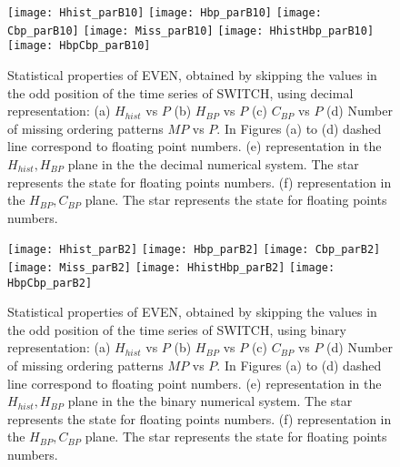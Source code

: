 \begin{figure}
	\texttt{[image: Hhist\_parB10]}
	\texttt{[image: Hbp\_parB10]}
	\texttt{[image: Cbp\_parB10]}
	\texttt{[image: Miss\_parB10]}
	\texttt{[image: HhistHbp\_parB10]}
	\texttt{[image: HbpCbp\_parB10]}
	\caption{Statistical properties of EVEN, obtained by skipping the values in the odd position of the time series of  SWITCH,  using decimal representation: (a) $H_{hist}$ vs $P$ (b) $H_{BP}$ vs $P$ (c) $C_{BP}$ vs $P$ (d) Number of missing ordering patterns $MP$ vs $P$. In Figures (a) to (d) dashed line correspond to floating point numbers. (e) representation in the $H_{hist},H_{BP}$ plane in the the decimal numerical system.  The star represents the state for floating points numbers. (f) representation in the $H_{BP},C_{BP}$ plane.  The star represents the state for floating points numbers. } \label{fig:seqpardec}
\end{figure}

\begin{figure}
	\texttt{[image: Hhist\_parB2]}
	\texttt{[image: Hbp\_parB2]}
	\texttt{[image: Cbp\_parB2]}
	\texttt{[image: Miss\_parB2]}
	\texttt{[image: HhistHbp\_parB2]}
	\texttt{[image: HbpCbp\_parB2]}
	\caption{Statistical properties of EVEN, obtained by skipping the values in the odd position of the time series of  SWITCH,  using binary representation: (a) $H_{hist}$ vs $P$ (b) $H_{BP}$ vs $P$ (c) $C_{BP}$ vs $P$ (d) Number of missing ordering patterns $MP$ vs $P$. In Figures (a) to (d) dashed line correspond to floating point numbers. (e) representation in the $H_{hist},H_{BP}$ plane in the the binary numerical system.  The star represents the state for floating points numbers. (f) representation in the $H_{BP},C_{BP}$ plane.  The star represents the state for floating points numbers.  } \label{fig:seqparbin}
\end{figure}


